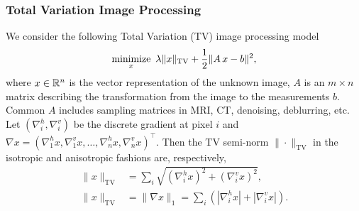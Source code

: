 \subsubsection{Total Variation Image Processing}
We consider the following Total Variation (TV) image processing model
\begin{equation}\label{eqn:tvl2}
\Min_{x}~\lambda \|x\|_{\text{TV}} + \frac{1}{2} \|A\,x - b\|^2,
\end{equation}
where $x\in \mathbb{R}^n$ is the vector representation of the unknown image, $A$ is an $m \times n$ matrix describing the transformation from the image to the measurements $b$. Common $A$ includes sampling matrices in MRI, CT, denoising, deblurring, etc.  Let $(\nabla_i^h,\nabla_i^v)$ be the discrete gradient at pixel $i$ and $\nabla x=(\nabla_1^hx,\nabla_1^vx,\dots,\nabla_n^hx,\nabla_n^vx)^\top$. Then the TV semi-norm $\|\cdot\|_{\text{TV}}$ in the isotropic and anisotropic fashions are, respectively,
\begin{subequations}\label{eqn:tv_def}
\begin{align}
\|x\|_{\text{TV}} &= {\sum_{i} \sqrt{(\nabla_i^h x)^2 + (\nabla_i^v x)^2},}\\
  \| x\|_{\text{TV}} &= \| \nabla x\|_1 = \sum_{i} \left(|\nabla_i^h x| + |\nabla_i^v x|\right).
	\end{align}
\end{subequations}

%
%
%

